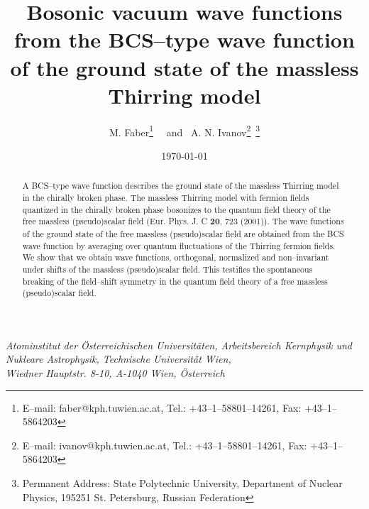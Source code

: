 \documentclass[a4paper,12pt] {article}
\begin{document}
\setcounter{page}{1}


\title{Bosonic vacuum wave functions from the BCS--type wave function
of the ground state of the massless Thirring model}

\author{M. Faber\thanks{E--mail: faber@kph.tuwien.ac.at, Tel.:
+43--1--58801--14261, Fax: +43--1--5864203} ~~and~
A. N. Ivanov\thanks{E--mail: ivanov@kph.tuwien.ac.at, Tel.:
+43--1--58801--14261, Fax: +43--1--5864203}~\thanks{Permanent Address:
State Polytechnic University, Department of Nuclear Physics, 195251
St. Petersburg, Russian Federation}}

\date{\today}

\maketitle

\vspace{-0.5in}
\begin{center}
{\it Atominstitut der \"Osterreichischen Universit\"aten,
Arbeitsbereich Kernphysik und Nukleare Astrophysik, Technische
Universit\"at Wien, \\ Wiedner Hauptstr. 8-10, A-1040 Wien,
\"Osterreich }
\end{center}

\begin{center}
\begin{abstract}
A BCS--type wave function describes the ground state of the massless
Thirring model in the chirally broken phase. The massless Thirring
model with fermion fields quantized in the chirally broken phase
bosonizes to the quantum field theory of the free massless
(pseudo)scalar field (Eur. Phys. J. C {\bf 20}, 723 (2001)). The wave
functions of the ground state of the free massless (pseudo)scalar
field are obtained from the BCS wave function by averaging over
quantum fluctuations of the Thirring fermion fields. We show that we
obtain wave functions, orthogonal, normalized and non--invariant under
shifts of the massless (pseudo)scalar field. This testifies the
spontaneous breaking of the field--shift symmetry in the quantum field
theory of a free massless (pseudo)scalar field.
\end{abstract}
\end{center}

\newpage
\end{document}
